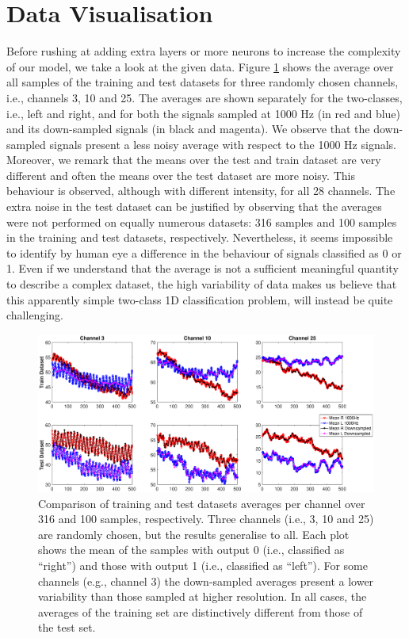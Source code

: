 \documentclass{article}
\begin{document}
 \section{Data Visualisation}\label{sec_visual}
 Before rushing at adding extra layers or more neurons to increase the complexity of our model, we  take a look at the given data. 
 Figure \ref{fig_mean_1000hz_vs_downsampled} shows the average over all samples of the training and test datasets for three randomly chosen channels, i.e., channels 3, 10 and 25. 
The averages are shown separately for the two-classes, i.e., left and right, and for both the signals sampled at 1000 Hz (in red and blue) and its down-sampled signals (in black and magenta). 
We  observe that the down-sampled signals present a less noisy average with respect to the 1000 Hz signals. 
Moreover, we remark that  the means over the test and train dataset are very different and often the means over the test dataset are more noisy. 
This behaviour is observed, although with different intensity, for all 28 channels. 
The extra noise in the test dataset can be justified by observing that the averages were not performed on equally numerous datasets: 316 samples and 100 samples in the training and test datasets, respectively. 
Nevertheless, it seems impossible to identify by human eye a difference in the behaviour of signals classified as 0 or 1. 
Even if we understand that the average is not a sufficient meaningful quantity to describe a complex dataset, the high variability of data makes us believe that this apparently simple two-class 1D classification problem, will instead be quite challenging.  
 \begin{figure}[h]
 \begin{center}
  \includegraphics[width=1\textwidth]{fig/fig4new_mean_downsampled_vs1000} 
  \caption{Comparison of training and test datasets averages per channel over 316 and 100 samples, respectively.  
  Three channels (i.e., 3, 10 and 25) are randomly chosen, but the results generalise to all. 
  Each plot shows the mean of the samples with output 0 (i.e., classified as ``right'') and those with output 1 (i.e., classified as ``left''). 
For some channels (e.g., channel 3) the down-sampled averages present a lower variability than those sampled at higher resolution. 
  In all cases, the averages of the training set are distinctively different from those of the test set. 
  \label{fig_mean_1000hz_vs_downsampled}}
  \end{center}
  \end{figure}
\end{document}
